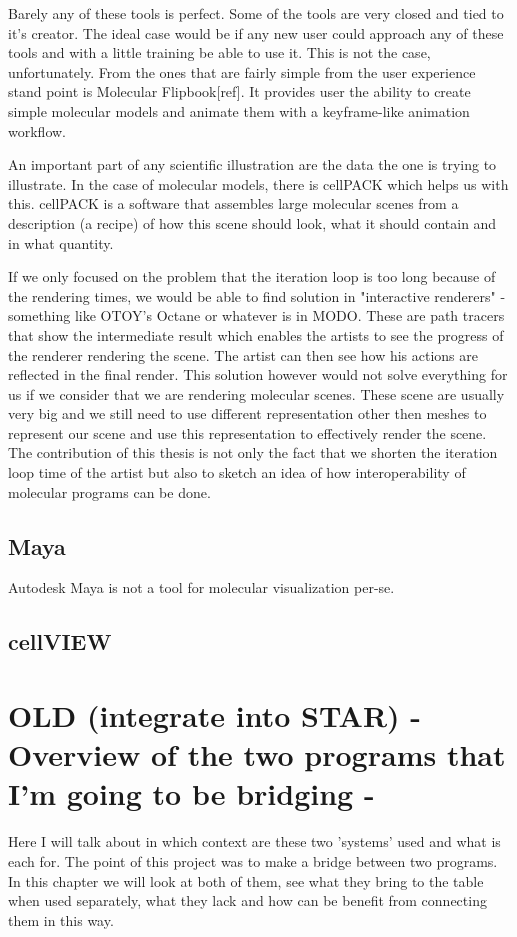 \documentclass[
  digital, %
  table,   %
  lof,     %
  lot,     %
]{fithesis3}
\begin{document}
Barely any of these tools is perfect. Some of the tools are very closed and tied to it's creator. The ideal case would be if any new user could approach any of these tools and with a little training be able to use it. This is not the case, unfortunately.
From the ones that are fairly simple from the user experience stand point is Molecular Flipbook[ref]. It provides user the ability to create simple molecular models and animate them with a keyframe-like animation workflow. 

An important part of any scientific illustration are the data the one is trying to illustrate. In the case of molecular models, there is cellPACK which helps us with this. cellPACK is a software that assembles large molecular scenes from a description (a recipe) of how this scene should look, what it should contain and in what quantity.

If we only focused on the problem that the iteration loop is too long because of the rendering times, we would be able to find solution in "interactive renderers" - something like OTOY's Octane or whatever is in MODO. These are path tracers that show the intermediate result which enables the artists to see the progress of the renderer rendering the scene. The artist can then see how his actions are reflected in the final render. This solution however would not solve everything for us if we consider that we are rendering molecular scenes. These scene are usually very big and we still need to use different representation other then meshes to represent our scene and use this representation to effectively render the scene. The contribution of this thesis is not only the fact that we shorten the iteration loop time of the artist but also to sketch an idea of how interoperability of molecular programs can be done.

\section{Maya}
Autodesk Maya is not a tool for molecular visualization per-se.
\section{cellVIEW}

\chapter{OLD (integrate into STAR) - Overview of the two programs that I'm going to be bridging - }
Here I will talk about in which context are these two 'systems' used and what is each for.
The point of this project was to make a bridge between two programs. In this chapter we will look at both of them, see what they bring to the table when used separately, what they lack and how can be benefit from connecting them in this way.
\end{document}
